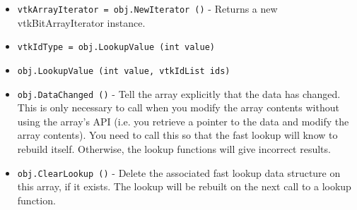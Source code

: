 \begin{itemize}
\item  \verb|vtkArrayIterator = obj.NewIterator ()| -  Returns a new vtkBitArrayIterator instance.

\item  \verb|vtkIdType = obj.LookupValue (int value)|

\item  \verb|obj.LookupValue (int value, vtkIdList ids)|

\item  \verb|obj.DataChanged ()| -  Tell the array explicitly that the data has changed.
 This is only necessary to call when you modify the array contents
 without using the array's API (i.e. you retrieve a pointer to the
 data and modify the array contents).  You need to call this so that
 the fast lookup will know to rebuild itself.  Otherwise, the lookup
 functions will give incorrect results.

\item  \verb|obj.ClearLookup ()| -  Delete the associated fast lookup data structure on this array,
 if it exists.  The lookup will be rebuilt on the next call to a lookup
 function.

\end{itemize}
